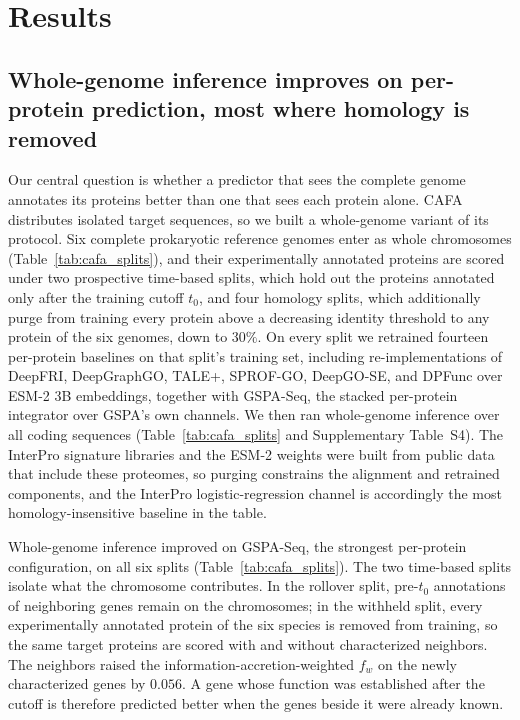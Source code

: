 \documentclass[10pt,twocolumn]{article}
\begin{document}
\section{Results}

\subsection{Whole-genome inference improves on per-protein prediction, most where homology is removed}



Our central question is whether a predictor that sees the complete genome annotates its proteins better than one that sees each protein alone. CAFA distributes isolated target sequences, so we built a whole-genome variant of its protocol. Six complete prokaryotic reference genomes enter as whole chromosomes (Table~\ref{tab:cafa_splits}), and their experimentally annotated proteins are scored under two prospective time-based splits, which hold out the proteins annotated only after the training cutoff $t_0$, and four homology splits, which additionally purge from training every protein above a decreasing identity threshold to any protein of the six genomes, down to $30\%$. On every split we retrained fourteen per-protein baselines on that split's training set, including re-implementations of DeepFRI, DeepGraphGO, TALE+, SPROF-GO, DeepGO-SE, and DPFunc over ESM-2 3B embeddings, together with GSPA-Seq, the stacked per-protein integrator over GSPA's own channels. We then ran whole-genome inference over all coding sequences (Table~\ref{tab:cafa_splits} and Supplementary Table~S4). The InterPro signature libraries and the ESM-2 weights were built from public data that include these proteomes, so purging constrains the alignment and retrained components, and the InterPro logistic-regression channel is accordingly the most homology-insensitive baseline in the table.

Whole-genome inference improved on GSPA-Seq, the strongest per-protein configuration, on all six splits (Table~\ref{tab:cafa_splits}). The two time-based splits isolate what the chromosome contributes. In the rollover split, pre-$t_0$ annotations of neighboring genes remain on the chromosomes; in the withheld split, every experimentally annotated protein of the six species is removed from training, so the same target proteins are scored with and without characterized neighbors. The neighbors raised the information-accretion-weighted $f_w$ on the newly characterized genes by $0.056$. A gene whose function was established after the cutoff is therefore predicted better when the genes beside it were already known.
\end{document}
